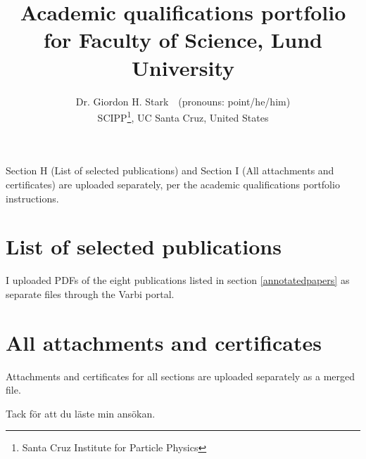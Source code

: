 \documentclass[12pt,a4paper,sans, oneside]{book}
\title{\Huge Academic qualifications portfolio for Faculty of Science, Lund University}
\author{\large Dr. Giordon H. Stark\ \faIcon{deaf}\ {\small\color{gray}(pronouns: point/he/him)}\\[1em]\faIcon{university} SCIPP\thanks{Santa Cruz Institute for Particle Physics}, UC Santa Cruz, United States}
\date{}
\begin{document}
\maketitle

\tableofcontents

\vspace{1cm}
\noindent Section H (List of selected publications) and Section I (All attachments and certificates) are uploaded separately, per the academic qualifications portfolio instructions.















\vspace{2cm}

\section{List of selected publications} \label{sec:list-of-selected-publications}
I uploaded PDFs of the eight publications listed in section \ref{annotatedpapers} as separate files through the Varbi portal.

\section{All attachments and certificates} \label{sec:all-attachments-and-certificates}
Attachments and certificates for all sections are uploaded separately as a merged file.

\vspace{0.5cm}
\noindent Tack f\"or att du l\"aste min ans\"okan.
\end{document}

